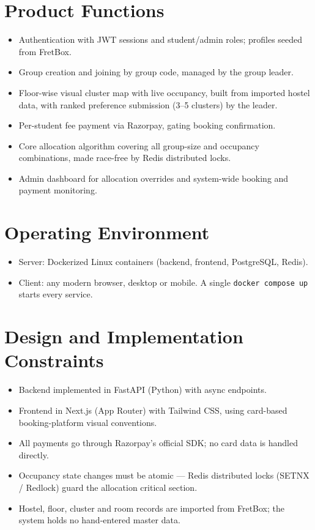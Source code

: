 \documentclass[11pt]{report}
\begin{document}
\section{Product Functions}
\begin{itemize}[leftmargin=1.2cm]
    \item Authentication with JWT sessions and student/admin roles; profiles seeded from FretBox.
    \item Group creation and joining by group code, managed by the group leader.
    \item Floor-wise visual cluster map with live occupancy, built from imported hostel data, with ranked preference submission (3--5 clusters) by the leader.
    \item Per-student fee payment via Razorpay, gating booking confirmation.
    \item Core allocation algorithm covering all group-size and occupancy combinations, made race-free by Redis distributed locks.
    \item Admin dashboard for allocation overrides and system-wide booking and payment monitoring.
\end{itemize}

\section{Operating Environment}
\begin{itemize}[leftmargin=1.2cm]
    \item Server: Dockerized Linux containers (backend, frontend, PostgreSQL, Redis).
    \item Client: any modern browser, desktop or mobile. A single \texttt{docker compose up} starts every service.
\end{itemize}

\section{Design and Implementation Constraints}
\begin{itemize}[leftmargin=1.2cm]
    \item Backend implemented in FastAPI (Python) with async endpoints.
    \item Frontend in Next.js (App Router) with Tailwind CSS, using card-based booking-platform visual conventions.
    \item All payments go through Razorpay's official SDK; no card data is handled directly.
    \item Occupancy state changes must be atomic --- Redis distributed locks (SETNX / Redlock) guard the allocation critical section.
    \item Hostel, floor, cluster and room records are imported from FretBox; the system holds no hand-entered master data.
\end{itemize}
\end{document}
